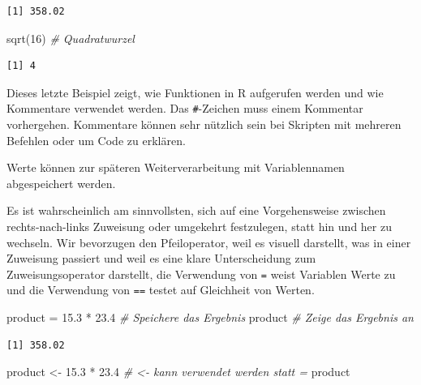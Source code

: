 \documentclass[
  ngerman,
]{scrbook}
\newenvironment{Shaded}{\begin{snugshade}}{\end{snugshade}}
\newcommand{\CommentTok}[1]{\textcolor[rgb]{0.56,0.35,0.01}{\textit{#1}}}
\newcommand{\DecValTok}[1]{\textcolor[rgb]{0.00,0.00,0.81}{#1}}
\newcommand{\FloatTok}[1]{\textcolor[rgb]{0.00,0.00,0.81}{#1}}
\newcommand{\FunctionTok}[1]{\textcolor[rgb]{0.00,0.00,0.00}{#1}}
\newcommand{\NormalTok}[1]{#1}
\newcommand{\OtherTok}[1]{\textcolor[rgb]{0.56,0.35,0.01}{#1}}
\newcommand{\SpecialCharTok}[1]{\textcolor[rgb]{0.00,0.00,0.00}{#1}}
\newenvironment{note}[1]
  {
  \begin{itemize}
  \renewcommand{\labelitemi}{
    \raisebox{-.01\height}[0pt][0pt]{
      {\setkeys{Gin}{width=7em,keepaspectratio}
        {\normalsize \textcolor{dark-fom-green}\faHashtag}}
        }
  }
  \begin{blackbox}
   \item
    }
    {
  \end{blackbox}
  \end{itemize}
  }
\begin{document}
\begin{verbatim}
[1] 358.02
\end{verbatim}

\begin{Shaded}
\begin{Highlighting}[]
\FunctionTok{sqrt}\NormalTok{(}\DecValTok{16}\NormalTok{)    }\CommentTok{\# Quadratwurzel}
\end{Highlighting}
\end{Shaded}

\begin{verbatim}
[1] 4
\end{verbatim}

Dieses letzte Beispiel zeigt, wie Funktionen in \textsf{R} aufgerufen werden und wie Kommentare verwendet werden. Das \texttt{\#}-Zeichen muss einem Kommentar vorhergehen. Kommentare können sehr nützlich sein bei Skripten mit mehreren Befehlen oder um Code zu erklären.

Werte können zur späteren Weiterverarbeitung mit Variablennamen abgespeichert werden.

\begin{note}{note}
Es ist wahrscheinlich am sinnvollsten, sich auf eine Vorgehensweise zwischen rechts-nach-links Zuweisung oder umgekehrt festzulegen, statt hin und her zu wechseln. Wir bevorzugen den Pfeiloperator, weil es visuell darstellt, was in einer Zuweisung passiert und weil es eine klare Unterscheidung zum Zuweisungsoperator darstellt, die Verwendung von \texttt{=} weist Variablen Werte zu und die Verwendung von \texttt{==} testet auf Gleichheit von Werten.

\end{note}

\begin{Shaded}
\begin{Highlighting}[]
\NormalTok{product }\OtherTok{=} \FloatTok{15.3} \SpecialCharTok{*} \FloatTok{23.4}       \CommentTok{\# Speichere das Ergebnis}
\NormalTok{product                     }\CommentTok{\# Zeige das Ergebnis an}
\end{Highlighting}
\end{Shaded}

\begin{verbatim}
[1] 358.02
\end{verbatim}

\begin{Shaded}
\begin{Highlighting}[]
\NormalTok{product }\OtherTok{\textless{}{-}} \FloatTok{15.3} \SpecialCharTok{*} \FloatTok{23.4}      \CommentTok{\# \textless{}{-} kann verwendet werden statt =}
\NormalTok{product  }
\end{Highlighting}
\end{Shaded}
\end{document}

